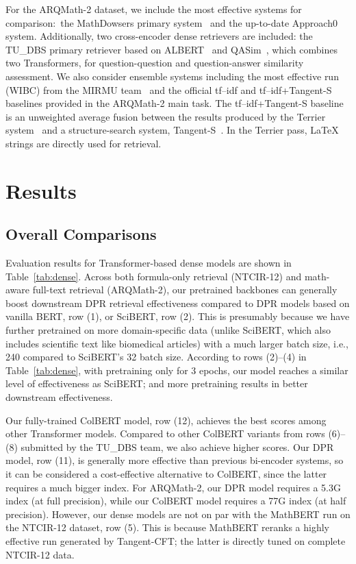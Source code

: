 \documentclass[11pt]{article}
\begin{document}
For the ARQMath-2 dataset, we include the most effective systems for comparison:\ the MathDowsers primary system~\cite{fraser2018tangentL,ng2020dowsing,ng2021dowsing,ng2021thesis} and the up-to-date Approach0 system.
Additionally, two cross-encoder dense retrievers are included: the TU\_DBS primary retriever based on ALBERT~\cite{reusch2021albert} and  QASim~\cite{mansouri2021dprl}, which combines two Transformers, for question-question and question-answer similarity assessment.
We also consider ensemble systems including the most effective run (WIBC) from the MIRMU team~\cite{novotny2021ensembling} and the official tf--idf and tf--idf+Tangent-S baselines provided in the ARQMath-2 main task.
The tf--idf+Tangent-S baseline is an unweighted average fusion between the results produced by the Terrier system~\cite{Ounis2005Terrier} and a structure-search system, Tangent-S~\cite{davila2017layout}.
In the Terrier pass, \LaTeX{} strings are directly used for retrieval.

\section{Results}

\subsection{Overall Comparisons}
\label{sect:comp}
Evaluation results for Transformer-based dense models are shown in Table~\ref{tab:dense}.
Across both formula-only retrieval (NTCIR-12) and math-aware full-text retrieval (ARQMath-2), our pretrained backbones can generally boost downstream DPR retrieval effectiveness compared to DPR models based on vanilla BERT, row (1), or SciBERT, row (2).
This is presumably because we have further pretrained on more domain-specific data (unlike SciBERT, which also includes scientific text like biomedical articles) with a much larger batch size, i.e., 240 compared to SciBERT's 32 batch size.
According to rows (2)--(4) in Table~\ref{tab:dense}, with pretraining only for 3 epochs, our model reaches a similar level of effectiveness as SciBERT; and more pretraining results in better downstream effectiveness.

Our fully-trained ColBERT model, row (12), achieves the best scores among other Transformer models.
Compared to other ColBERT variants from rows (6)--(8) submitted by the TU\_DBS team, we also achieve higher scores.
Our DPR model, row (11), is generally more effective than previous bi-encoder systems, so it can be considered a cost-effective alternative to ColBERT, since the latter requires a much bigger index.
For ARQMath-2, our DPR model requires a 5.3G index (at full precision), while our ColBERT model requires a 77G index (at half precision).
However, our dense models are not on par with the MathBERT run on the NTCIR-12 dataset, row (5).
This is because MathBERT reranks a highly effective run generated by Tangent-CFT; the latter is directly tuned on complete NTCIR-12 data.
\end{document}

